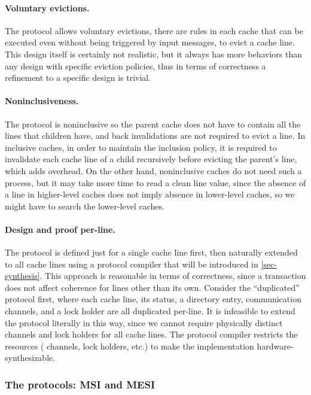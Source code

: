 \paragraph{Voluntary evictions.}

The protocol allows voluntary evictions, \ie{} there are rules in each cache that can be executed even without being triggered by input messages, to evict a cache line.
This design itself is certainly not realistic, but it always has more behaviors than any design with specific eviction policies, thus in terms of correctness a refinement to a specific design is trivial.

\paragraph{Noninclusiveness.}

The protocol is noninclusive so the parent cache does not have to contain all the lines that children have, and back invalidations are not required to evict a line.
In inclusive caches, in order to maintain the inclusion policy, it is required to invalidate each cache line of a child recursively before evicting the parent's line, which adds overhead.
On the other hand, noninclusive caches do not need such a process, but it may take more time to read a clean line value, since the absence of a line in higher-level caches does not imply absence in lower-level caches, so we might have to search the lower-level caches.

\paragraph{Design and proof per-line.}

The protocol is defined just for a single cache line first, then naturally extended to all cache lines using a protocol compiler that will be introduced in \autoref{sec-synthesis}.
This approach is reasonable in terms of correctness, since a transaction does not affect coherence for lines other than its own.
Consider the ``duplicated'' protocol first, where each cache line, its status, a directory entry, communication channels, and a lock holder are all duplicated per-line.
It is infeasible to extend the protocol literally in this way, since we cannot require physically distinct channels and lock holders for all cache lines.
The protocol compiler restricts the resources (\eg{} channels, lock holders, etc.) to make the implementation hardware-synthesizable.

\subsubsection{The protocols: MSI and MESI}
\label{sec-protocols}

